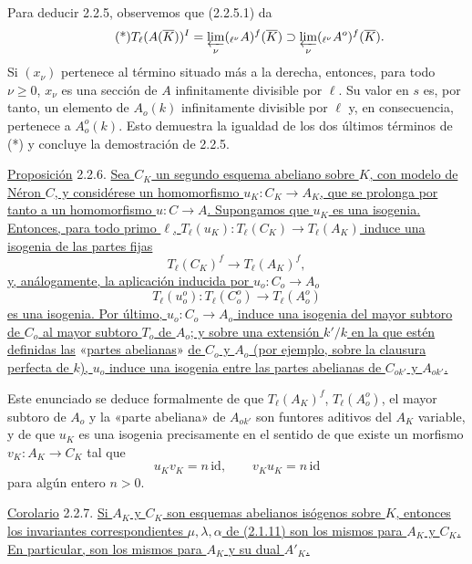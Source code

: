 Para deducir 2.2.5, observemos que (2.2.5.1) da
\begin{equation}\tag{*}
 T_\ell(A(\overline K))^I
 =\varprojlim_\nu({}_{\ell^\nu}A)^f(\overline K)
 \supset\varprojlim_\nu({}_{\ell^\nu}A^o)^f(\overline K).
\end{equation}
Si $(x_\nu)$ pertenece al término situado más a la derecha, entonces,
para todo $\nu\geq0$, $x_\nu$ es una sección de $A$ infinitamente
divisible por $\ell$. Su valor en $s$ es, por tanto, un elemento de
$A_o(k)$ infinitamente divisible por $\ell$ y, en consecuencia,
pertenece a $A_o^o(k)$. Esto demuestra la igualdad de los dos últimos
términos de (*) y concluye la demostración de 2.2.5.

\medskip
\noindent
\underline{Proposición} 2.2.6. \underline{Sea $C_K$ un segundo esquema
abeliano sobre $K$, con modelo de Néron $C$, y considérese un
homomorfismo $u_K:C_K\longrightarrow A_K$, que se prolonga por tanto a
un homomorfismo $u:C\longrightarrow A$. Supongamos que $u_K$ es una
isogenia. Entonces, para todo primo $\ell$,
$T_\ell(u_K):T_\ell(C_K)\longrightarrow T_\ell(A_K)$ induce una
isogenia de las partes fijas}
\begin{equation}\tag{2.2.6.1}
 T_\ell(C_K)^f\longrightarrow T_\ell(A_K)^f,
\end{equation}
\underline{y, análogamente, la aplicación inducida por
$u_o:C_o\longrightarrow A_o$}
\begin{equation}\tag{2.2.6.2}
 T_\ell(u_o^o):T_\ell(C_o^o)\longrightarrow T_\ell(A_o^o)
\end{equation}
\underline{es una isogenia. Por último, $u_o:C_o\longrightarrow A_o$
induce una isogenia del mayor subtoro de $C_o$ al mayor subtoro $T_o$
de $A_o$; y sobre una extensión $k'/k$ en la que estén definidas las}
«\underline{partes abelianas}» \underline{de $C_o$ y $A_o$ (por ejemplo, sobre la clausura
perfecta de $k$), $u_o$ induce una isogenia entre las partes abelianas
de $C_{ok'}$ y $A_{ok'}$.}

Este enunciado se deduce formalmente de que $T_\ell(A_K)^f$,
$T_\ell(A_o^o)$, el mayor subtoro de $A_o$ y la «parte abeliana» de
$A_{ok'}$ son funtores aditivos del $A_K$ variable, y de que $u_K$ es
una isogenia precisamente en el sentido de que existe un morfismo
$v_K:A_K\longrightarrow C_K$ tal que
\[
 u_Kv_K=n\,\mathrm{id},\qquad v_Ku_K=n\,\mathrm{id}
\]
para algún entero $n>0$.

\medskip
\noindent
\underline{Corolario} 2.2.7. \underline{Si $A_K$ y $C_K$ son esquemas
abelianos isógenos sobre $K$, entonces los invariantes correspondientes
$\mu,\lambda,\alpha$ de (2.1.11) son los mismos para $A_K$ y $C_K$. En
particular, son los mismos para $A_K$ y su dual $A'_K$.}

